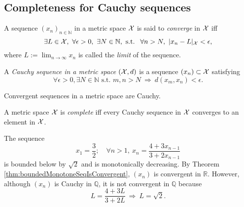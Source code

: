 \subsection{Completeness for Cauchy sequences}
\label{sec:completenessCauchySeq}


\begin{defn}
  \label{def:convergenceOfSequenceMetricSpace}
  A sequence $(x_n)_{n\in\mathbb{N}}$ in a metric space ${\cal X}$
  is said to \emph{converge} in ${\cal X}$ iff
  \begin{equation}
    \label{eq:convergenceOfSequenceMetricSpace}
    \exists L\in{\cal X},\ 
    \forall \epsilon>0,\ \exists N\in \mathbb{N}, \text{ s.t. }\ 
    \forall n>N, \ |x_n-L|_{\cal X} < \epsilon,
  \end{equation}
  where $L:=\lim_{n\rightarrow\infty} x_n$
  is called the \emph{limit} of the sequence.
\end{defn}

\begin{defn}
  \label{def:CauchySeqMetricSpace}
  A \emph{Cauchy sequence in a metric space} $({\cal X},d)$
  is a sequence $(x_n)\subset {\cal X}$ satisfying
  \begin{equation}
    \label{eq:CauchySeqMetricSpace}
    \forall \epsilon>0, \exists N\in\mathbb{N} \text{ s.t. }
    m,n > N\ \Rightarrow\ d(x_m,x_n) <\epsilon.
  \end{equation}
\end{defn}


\begin{lem}
  \label{lem:convergentSeqIsCauchyMetric}
  Convergent sequences in a metric space are Cauchy.
\end{lem}


\begin{defn}
  \label{def:completeMetricSpace}  
  A metric space ${\cal X}$ is \emph{complete} iff
  every Cauchy sequence in ${\cal X}$ converges
  to an element in ${\cal X}$.
\end{defn}


\begin{exm}
  \label{exm:QisNotComplete}
  The sequence %
  \begin{equation}
    \label{eq:rationalSeqCauchy}
    x_1=\frac{3}{2};\quad
    \forall n>1,\ x_{n} = \frac{4 + 3 x_{n-1}}{3 + 2 x_{n-1}}
  \end{equation}
  is bounded below by $\sqrt{2}$
  and is monotonically decreasing.
  By Theorem \ref{thm:boundedMonotoneSeqIsConvergent},
  $(x_n)$ is convergent in $\mathbb{R}$.
  However, although $(x_n)$ is Cauchy in $\mathbb{Q}$,
  it is not convergent in $\mathbb{Q}$ because
  \begin{displaymath}
    L = \frac{4+3L}{3+2L} \ \Rightarrow\ 
    L=\sqrt{2}.
  \end{displaymath}
\end{exm}


